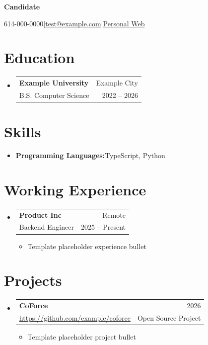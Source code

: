 \documentclass[a4paper,10pt]{article}
\makeatletter
\newcommand{\resumeItem}[2]{\item \textbf{#1}\hspace{0.5mm}#2}
\newcommand{\resumeSubheading}[4]{\item\begin{tabular*}{\linewidth}{l@{\extracolsep{\fill}}r}\textbf{#1} & #4 \\ #3 & #2\end{tabular*}}
\newcommand{\resumeSubItem}[2]{\resumeItem{#1}{#2}}
\newcommand{\resumeSubHeadingListStart}{\begin{itemize}[leftmargin=*,labelsep=1mm]}
\newcommand{\resumeHeadingSkillStart}{\begin{itemize}[leftmargin=*,itemsep=1mm]}
\newcommand{\resumeItemListStart}{\begin{itemize}[leftmargin=*,labelsep=1mm,itemsep=0.5mm,topsep=0pt,parsep=0pt,partopsep=0pt]}
\newcommand{\resumeSubHeadingListEnd}{\end{itemize}\vspace{2mm}}
\newcommand{\resumeHeadingSkillEnd}{\end{itemize}\vspace{-2mm}}
\newcommand{\resumeItemListEnd}{\end{itemize}\vspace{-2mm}}
\newcommand{\resumeSectionTransition}{\vspace{-10mm}}
\makeatother
\begin{document}
\begin{center}\textbf{Candidate}\end{center}
\vspace{-4mm}
\begin{center}\small{
614-000-0000|\href{mailto:test@example.com}{test@example.com}|\href{https://example.com}{Personal Web}}
\end{center}
\vspace{-5mm}
\section{\textbf{Education}}
\vspace{-0.4mm}
\resumeSubHeadingListStart
\resumeSubheading{Example University}{2022 -- 2026}{B.S. Computer Science}{Example City}
\resumeSubHeadingListEnd
\vspace{-5mm}
\section{\textbf{Skills}}
\resumeHeadingSkillStart
\resumeSubItem{Programming Languages:}{TypeScript, Python}
\resumeHeadingSkillEnd
\vspace{-4mm}
\section{\textbf{Working Experience}}
\resumeSubHeadingListStart
\resumeSubheading{Product Inc}{2025 -- Present}{Backend Engineer}{Remote}
\resumeItemListStart
\resumeItem{}{Template placeholder experience bullet}
\resumeItemListEnd
\resumeSubHeadingListEnd
\resumeSectionTransition
\section{\textbf{Projects}}
\vspace{-1mm}
\resumeSubHeadingListStart
\resumeSubheading{CoForce}{Open Source Project}{\href{https://github.com/example/coforce}{https://github.com/example/coforce}}{2026}
\resumeItemListStart
\resumeItem{}{Template placeholder project bullet}
\resumeItemListEnd
\resumeSubHeadingListEnd
\vspace{-5mm}
\end{document}
